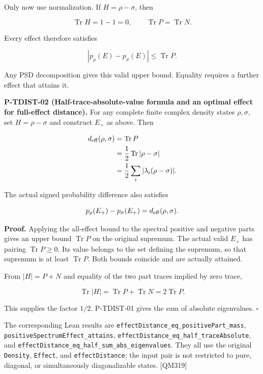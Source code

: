 \documentclass[
  11pt,
  oneside]{book}
\begin{document}
Only now use normalization. If \(H=\rho-\sigma\), then

\[
\operatorname{Tr}H=1-1=0,
\qquad
\operatorname{Tr}P=\operatorname{Tr}N.
\]

Every effect therefore satisfies

\[
|p_\rho(E)-p_\sigma(E)|\le\operatorname{Tr}P.
\]

Any PSD decomposition gives this valid upper bound. Equality requires a
further effect that attains it.

\label{p-tdist-02}{}

\textbf{P-TDIST-02 (Half-trace-absolute-value formula and an optimal
effect for full-effect distance).} For any complete finite complex
density states \(\rho,\sigma\), set \(H=\rho-\sigma\) and construct
\(E_+\) as above. Then

\[
\begin{aligned}
d_{\rm eff}(\rho,\sigma)
&=\operatorname{Tr}P\\
&=\frac12\operatorname{Tr}|\rho-\sigma|\\
&=\frac12\sum_i|\lambda_i(\rho-\sigma)|.
\end{aligned}
\]

The actual signed probability difference also satisfies

\[
p_\rho(E_+)-p_\sigma(E_+)
=d_{\rm eff}(\rho,\sigma).
\]

\textbf{Proof.} Applying the all-effect bound to the spectral positive
and negative parts gives an upper bound \(\operatorname{Tr}P\) on the
original supremum. The actual valid \(E_+\) has pairing
\(\operatorname{Tr}P\ge0\). Its value belongs to the set defining the
supremum, so that supremum is at least \(\operatorname{Tr}P\). Both
bounds coincide and are actually attained.

From \(|H|=P+N\) and equality of the two part traces implied by zero
trace,

\[
\operatorname{Tr}|H|
=\operatorname{Tr}P+\operatorname{Tr}N
=2\operatorname{Tr}P.
\]

This supplies the factor \(1/2\). P-TDIST-01 gives the sum of absolute
eigenvalues. \(\square\)

The corresponding Lean results are
\texttt{effect\allowbreak Distance\_\allowbreak eq\_\allowbreak positive\allowbreak Part\_\allowbreak mass},
\texttt{positive\allowbreak Spectrum\allowbreak Effect\_\allowbreak attains},
\texttt{effect\allowbreak Distance\_\allowbreak eq\_\allowbreak half\_\allowbreak trace\allowbreak Absolute}, and
\texttt{effect\allowbreak Distance\_\allowbreak eq\_\allowbreak half\_\allowbreak sum\_\allowbreak abs\_\allowbreak eigenvalues}. They all use
the original \texttt{Density}, \texttt{Effect}, and
\texttt{effect\allowbreak Distance}; the input pair is not restricted to pure,
diagonal, or simultaneously diagonalizable states. {[}QM319{]}
\end{document}
